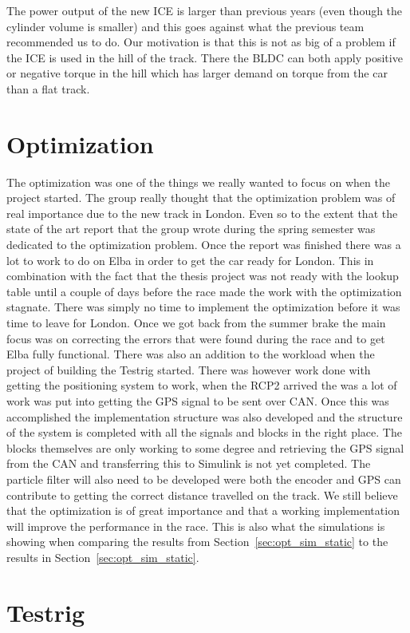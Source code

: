 The power output of the new ICE is larger than previous years (even though the cylinder volume is smaller) and this goes against what the previous team recommended us to do. 
Our motivation is that this is not as big of a problem if the ICE is used in the hill of the track. There the BLDC can both apply positive or negative torque in the hill which 
has larger demand on torque from the car than a flat track. 

\section{Optimization}
The optimization was one of the things we really wanted to focus on when the
project started. The group really thought that the optimization problem was of
real importance due to the new track in London. Even so to the extent that the
state of the art report that the group wrote during the spring semester was
dedicated to the optimization problem. Once the report was finished there was a
lot to work to do on Elba in order to get the car ready for London. This in
combination with the fact that the thesis project was not ready with the lookup
table until a couple of days before the race made the work with the optimization
stagnate. There was simply no time to implement the optimization before it was
time to leave for London. Once we got back from the summer brake the main focus
was on correcting the errors that were found during the race and to get Elba
fully functional. There was also an addition to the workload when the project of
building the Testrig started. There was however work done with getting the
positioning system to work, when the RCP2 arrived the was a lot of work was put into
getting the GPS signal to be sent over CAN\@. Once this was accomplished the
implementation structure was also developed and the structure of the system is
completed with all the signals and blocks in the right place. The blocks
themselves are only working to some degree and retrieving the GPS signal from the
CAN and transferring this to Simulink is not yet completed. The particle filter
will also need to be developed were both the encoder and GPS can contribute to
getting the correct distance travelled on the track. We still believe that the
optimization is of great importance and that a working implementation will
improve the performance in the race. This is also what the simulations is
showing when comparing the results from Section~\ref{sec:opt_sim_static} to the
results in Section~\ref{sec:opt_sim_static}.
\section{Testrig}
